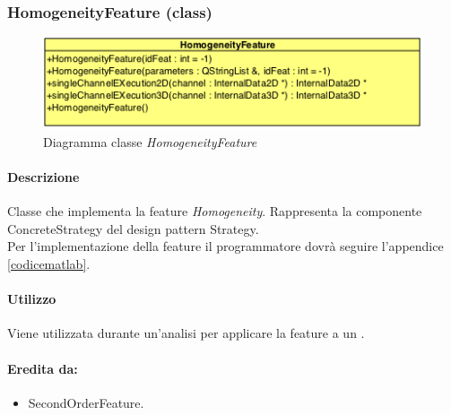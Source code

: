 \begin{itemize}
	\end{itemize}
\color{black}
\pagebreak
\subsubsection{HomogeneityFeature (class)}
\label{HomogeneityFeature}
\begin{figure}[!h]
\centering
			\includegraphics[scale=1]{./Content/Immagini/modelCore/HomogeneityFeature.png}
			\caption{Diagramma classe \textsl{HomogeneityFeature}}
			\label{HomogeneityFeature_img}
\end{figure}

\paragraph{Descrizione \\} Classe che implementa la feature\g{} \textit{Homogeneity}. Rappresenta la componente ConcreteStrategy del design pattern\g{} Strategy.
\\Per l'implementazione della feature\g{} il programmatore dovrà seguire l'appendice \ref{codicematlab}.

\paragraph{Utilizzo\\} Viene utilizzata durante un'analisi per applicare la feature\g{} a un \dataset{}.

\paragraph{Eredita da:}
\begin{itemize}
	\item SecondOrderFeature.
\end{itemize}



